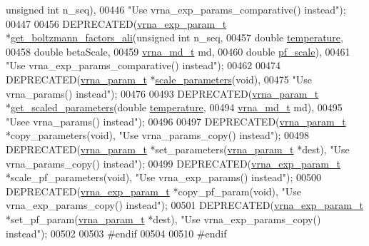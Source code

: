 \begin{DoxyCode}
{      unsigned} \textcolor{keywordtype}{int} n\_seq),
00446 \textcolor{stringliteral}{"Use vrna\_exp\_params\_comparative() instead"});
00447 
00456 DEPRECATED(\hyperlink{group__energy__parameters_structvrna__exp__param__s}{vrna\_exp\_param\_t} *\hyperlink{group__energy__parameters_ga2aa1d87c97f35d2e4121634a17556829}{get\_boltzmann\_factors\_ali}(\textcolor{keywordtype}{unsigned} \textcolor{keywordtype}{
      int} n\_seq,
00457                                                        \textcolor{keywordtype}{double}       \hyperlink{group__energy__parameters_aeed2cd83713012bcb52e431041e037c8}{temperature},
00458                                                        \textcolor{keywordtype}{double}       betaScale,
00459                                                        \hyperlink{group__model__details_structvrna__md__s}{vrna\_md\_t}    md,
00460                                                        \textcolor{keywordtype}{double}       \hyperlink{group__model__details_gad3b22044065acc6dee0af68931b52cfd}{pf\_scale}),
00461 \textcolor{stringliteral}{"Use vrna\_exp\_params\_comparative() instead"});
00462 
00474 DEPRECATED(\hyperlink{group__energy__parameters_structvrna__param__s}{vrna\_param\_t} *\hyperlink{group__energy__parameters_ga541f2cf7436e9bc939b0a49b24baf987}{scale\_parameters}(\textcolor{keywordtype}{void}),
00475 \textcolor{stringliteral}{"Use vrna\_params() instead"});
00476 
00493 DEPRECATED(\hyperlink{group__energy__parameters_structvrna__param__s}{vrna\_param\_t} *\hyperlink{group__energy__parameters_ga7fa6a000d7c16feab939f2c4ee626197}{get\_scaled\_parameters}(\textcolor{keywordtype}{double}     
      \hyperlink{group__energy__parameters_aeed2cd83713012bcb52e431041e037c8}{temperature},
00494                                                \hyperlink{group__model__details_structvrna__md__s}{vrna\_md\_t}  md),
00495 \textcolor{stringliteral}{"Usee vrna\_params() instead"});
00496 
00497 DEPRECATED(\hyperlink{group__energy__parameters_structvrna__param__s}{vrna\_param\_t} *copy\_parameters(\textcolor{keywordtype}{void}), \textcolor{stringliteral}{"Use vrna\_params\_copy() instead"});
00498 DEPRECATED(\hyperlink{group__energy__parameters_structvrna__param__s}{vrna\_param\_t} *set\_parameters(\hyperlink{group__energy__parameters_structvrna__param__s}{vrna\_param\_t} *dest), \textcolor{stringliteral}{"Use
       vrna\_params\_copy() instead"});
00499 DEPRECATED(\hyperlink{group__energy__parameters_structvrna__exp__param__s}{vrna\_exp\_param\_t} *scale\_pf\_parameters(\textcolor{keywordtype}{void}), \textcolor{stringliteral}{"Use vrna\_exp\_params() instead"});
00500 DEPRECATED(\hyperlink{group__energy__parameters_structvrna__exp__param__s}{vrna\_exp\_param\_t} *copy\_pf\_param(\textcolor{keywordtype}{void}), \textcolor{stringliteral}{"Use vrna\_exp\_params\_copy() instead"});
00501 DEPRECATED(\hyperlink{group__energy__parameters_structvrna__exp__param__s}{vrna\_exp\_param\_t} *set\_pf\_param(\hyperlink{group__energy__parameters_structvrna__param__s}{vrna\_param\_t} *dest), \textcolor{stringliteral}{"Use
       vrna\_exp\_params\_copy() instead"});
00502 
00503 \textcolor{preprocessor}{#endif}
00504 
00510 \textcolor{preprocessor}{#endif}
\end{DoxyCode}
